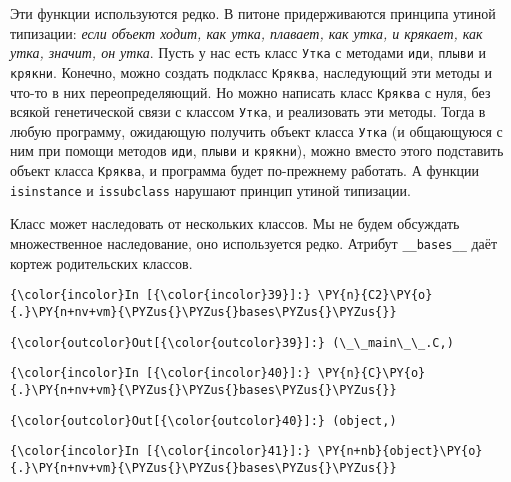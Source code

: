     Эти функции используются редко. В питоне придерживаются принципа утиной
типизации: \emph{если объект ходит, как утка, плавает, как утка, и
крякает, как утка, значит, он утка}. Пусть у нас есть класс
\texttt{Утка} с методами \texttt{иди}, \texttt{плыви} и \texttt{крякни}.
Конечно, можно создать подкласс \texttt{Кряква}, наследующий эти методы
и что-то в них переопределяющий. Но можно написать класс \texttt{Кряква}
с нуля, без всякой генетической связи с классом \texttt{Утка}, и
реализовать эти методы. Тогда в любую программу, ожидающую получить
объект класса \texttt{Утка} (и общающуюся с ним при помощи методов
\texttt{иди}, \texttt{плыви} и \texttt{крякни}), можно вместо этого
подставить объект класса \texttt{Кряква}, и программа будет по-прежнему
работать. А функции \texttt{isinstance} и \texttt{issubclass} нарушают
принцип утиной типизации.

Класс может наследовать от нескольких классов. Мы не будем обсуждать
множественное наследование, оно используется редко. Атрибут
\texttt{\_\_bases\_\_} даёт кортеж родительских классов.

    \begin{Verbatim}[commandchars=\\\{\}]
{\color{incolor}In [{\color{incolor}39}]:} \PY{n}{C2}\PY{o}{.}\PY{n+nv+vm}{\PYZus{}\PYZus{}bases\PYZus{}\PYZus{}}
\end{Verbatim}

            \begin{Verbatim}[commandchars=\\\{\}]
{\color{outcolor}Out[{\color{outcolor}39}]:} (\_\_main\_\_.C,)
\end{Verbatim}
        
    \begin{Verbatim}[commandchars=\\\{\}]
{\color{incolor}In [{\color{incolor}40}]:} \PY{n}{C}\PY{o}{.}\PY{n+nv+vm}{\PYZus{}\PYZus{}bases\PYZus{}\PYZus{}}
\end{Verbatim}

            \begin{Verbatim}[commandchars=\\\{\}]
{\color{outcolor}Out[{\color{outcolor}40}]:} (object,)
\end{Verbatim}
        
    \begin{Verbatim}[commandchars=\\\{\}]
{\color{incolor}In [{\color{incolor}41}]:} \PY{n+nb}{object}\PY{o}{.}\PY{n+nv+vm}{\PYZus{}\PYZus{}bases\PYZus{}\PYZus{}}
\end{Verbatim}

